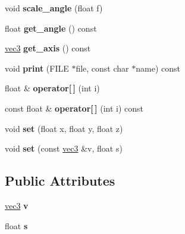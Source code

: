 \begin{DoxyCompactItemize}
\item 
\hypertarget{classquat_a8861fff3cf3e4dbc76c472dd0605efd7}{void {\bfseries scale\-\_\-angle} (float f)}\label{classquat_a8861fff3cf3e4dbc76c472dd0605efd7}

\item 
\hypertarget{classquat_ad174ed3eb73c015ec1c64db57cafcfed}{float {\bfseries get\-\_\-angle} () const }\label{classquat_ad174ed3eb73c015ec1c64db57cafcfed}

\item 
\hypertarget{classquat_a4f4db727d50a5ab0c23b7ffeb7b4c57b}{\hyperlink{classvec3}{vec3} {\bfseries get\-\_\-axis} () const }\label{classquat_a4f4db727d50a5ab0c23b7ffeb7b4c57b}

\item 
\hypertarget{classquat_ac2dcca32b18337fa8e67f89b9b207108}{void {\bfseries print} (F\-I\-L\-E $\ast$file, const char $\ast$name) const }\label{classquat_ac2dcca32b18337fa8e67f89b9b207108}

\item 
\hypertarget{classquat_acea2496f35b55cfb8a337695887441a6}{float \& {\bfseries operator\mbox{[}$\,$\mbox{]}} (int i)}\label{classquat_acea2496f35b55cfb8a337695887441a6}

\item 
\hypertarget{classquat_a45b8d8b7bb3b40ec22f8735c1f91c678}{const float \& {\bfseries operator\mbox{[}$\,$\mbox{]}} (int i) const }\label{classquat_a45b8d8b7bb3b40ec22f8735c1f91c678}

\item 
\hypertarget{classquat_a8e2e0b7557155d3ec789847cc6cc9404}{void {\bfseries set} (float x, float y, float z)}\label{classquat_a8e2e0b7557155d3ec789847cc6cc9404}

\item 
\hypertarget{classquat_a7a82f8b8a507699a54aaf57dabd89da9}{void {\bfseries set} (const \hyperlink{classvec3}{vec3} \&v, float s)}\label{classquat_a7a82f8b8a507699a54aaf57dabd89da9}

\end{DoxyCompactItemize}
\subsection*{Public Attributes}
\begin{DoxyCompactItemize}
\item 
\hypertarget{classquat_a2448ee0f87a5493b1765f1991d844f57}{\hyperlink{classvec3}{vec3} {\bfseries v}}\label{classquat_a2448ee0f87a5493b1765f1991d844f57}

\item 
\hypertarget{classquat_aca7e4a2b5505ba75ec3f493cfccc98a2}{float {\bfseries s}}\label{classquat_aca7e4a2b5505ba75ec3f493cfccc98a2}

\end{DoxyCompactItemize}
